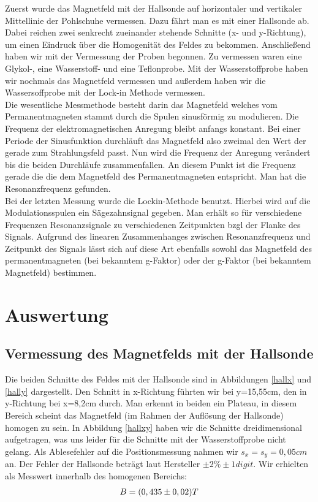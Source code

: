 \documentclass[12pt]{article}
\begin{document}
Zuerst wurde das Magnetfeld mit der Hallsonde auf horizontaler und vertikaler Mittellinie der Pohlschuhe vermessen.
Dazu fährt man es mit einer Hallsonde ab. Dabei reichen zwei senkrecht zueinander stehende Schnitte (x- und y-Richtung), um einen Eindruck über die Homogenität des Feldes zu bekommen.
 Anschließend haben wir mit der Vermessung der Proben begonnen. Zu vermessen waren eine Glykol-, eine Wasserstoff- und eine Teflonprobe. Mit der Wasserstoffprobe haben wir nochmals das Magnetfeld vermessen und außerdem haben wir die Wassersoffprobe mit der Lock-in Methode vermessen.\\


Die wesentliche Messmethode besteht darin das Magnetfeld welches vom Permanentmagneten stammt durch die Spulen sinusförmig zu modulieren. Die Frequenz der elektromagnetischen Anregung bleibt anfangs konstant. Bei einer Periode der Sinusfunktion durchläuft das Magnetfeld also zweimal den Wert der gerade zum Strahlungsfeld passt. Nun wird die Frequenz der Anregung verändert bis die beiden Durchläufe zusammenfallen. An diesem Punkt ist die Frequenz gerade die die dem Magnetfeld des Permanentmagneten entspricht. Man hat die Resonanzfrequenz gefunden.\\

Bei der letzten Messung wurde die Lockin-Methode benutzt. Hierbei wird auf die Modulationsspulen ein Sägezahnsignal gegeben. Man erhält so für verschiedene Frequenzen Resonanzsignale zu verschiedenen Zeitpunkten bzgl der Flanke des Signals. Aufgrund des linearen Zusammenhanges zwischen Resonanzfrequenz und Zeitpunkt des Signals lässt sich auf diese Art ebenfalls sowohl das Magnetfeld des permanentmagneten (bei bekanntem g-Faktor) oder der g-Faktor (bei bekanntem Magnetfeld) bestimmen.

\section{Auswertung}
\subsection{Vermessung des Magnetfelds mit der Hallsonde}
Die beiden Schnitte des Feldes mit der Hallsonde sind in Abbildungen \ref{hallx} und \ref{hally} dargestellt. Den Schnitt in x-Richtung führten wir bei y=15,55cm, den in y-Richtung bei x=8,2cm durch. Man erkennt in beiden ein Plateau, in diesem Bereich scheint das Magnetfeld (im Rahmen der Auflösung der Hallsonde) homogen zu sein. In Abbildung \ref{hallxy} haben wir die Schnitte dreidimensional aufgetragen, was uns leider für die Schnitte mit der Wasserstoffprobe nicht gelang. Als Ablesefehler auf die Positionsmessung nahmen wir $s_x = s_y = 0,05cm$ an. Der Fehler der Hallsonde beträgt laut Hersteller $\pm 2\% \pm 1digit$. Wir erhielten als Messwert innerhalb des homogenen Bereichs:
\begin{align}
 \notag B=(0,435 \pm 0,02) T
\end{align}
\end{document}

